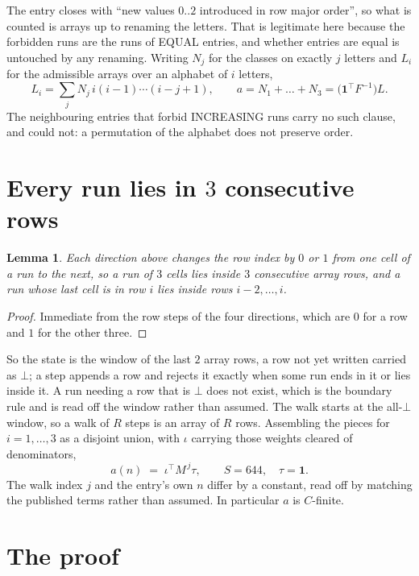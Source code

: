 \documentclass[11pt,a4paper]{article}
\theoremstyle{plain}
\newtheorem{lemma}[theorem]{Lemma}
\theoremstyle{definition}
\begin{document}
The entry closes with ``new values $0..2$ introduced in row major order'', so what is counted
is arrays up to renaming the letters. That is legitimate here because the forbidden runs are
the runs of EQUAL entries, and whether entries are equal is untouched by any renaming. Writing
$N_j$ for the classes on exactly $j$ letters and $L_i$ for the admissible arrays over an
alphabet of $i$ letters,
\[
L_i=\sum_j N_j\,i(i-1)\cdots(i-j+1),\qquad
a=N_1+\dots+N_{3}=\bigl(\mathbf{1}^{\!\top}F^{-1}\bigr)L .
\]
The neighbouring entries that forbid INCREASING runs carry no such clause, and could not: a
permutation of the alphabet does not preserve order.

\section{Every run lies in $3$ consecutive rows}

\begin{lemma}\label{lem:win}
Each direction above changes the row index by $0$ or $1$ from one cell of a run to the next, so
a run of $3$ cells lies inside $3$ consecutive array rows, and a run whose last cell is in
row $i$ lies inside rows $i-2,\dots,i$.
\end{lemma}

\begin{proof}
Immediate from the row steps of the four directions, which are $0$ for a row and $1$ for the
other three.
\end{proof}

So the state is the window of the last $2$ array rows, a row not yet written carried as
$\bot$; a step appends a row and rejects it exactly when some run ends in it or lies inside it.
A run needing a row that is $\bot$ does not exist, which is the boundary rule and is read off
the window rather than assumed. The walk starts at the all-$\bot$ window, so a walk of $R$ steps
is an array of $R$ rows. Assembling the pieces for $i=1,\dots,3$ as a disjoint union, with $\iota$ carrying those weights cleared of denominators,
\[
a(n)\;=\;\iota^{\!\top}M^{\,j}\tau ,\qquad S=644,\quad\tau=\mathbf{1} .
\]
The walk index $j$ and the entry's own $n$ differ by a constant, read off by matching the
published terms rather than assumed. In particular $a$ is $C$-finite.

\section{The proof}
\end{document}

